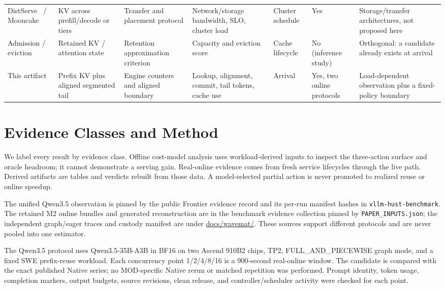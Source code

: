 \documentclass[conference]{IEEEtran}
\begin{document}
\begin{table}[t]
\begin{tabular}{p{}p{}p{}p{}p{}p{}p{}}
DistServe~\cite{distserve2024} / Mooncake~\cite{mooncake2025} & KV across prefill/decode or tiers & Transfer and placement protocol & Network/storage bandwidth, SLO, cluster load & Cluster schedule & Yes & Storage/transfer architectures, not proposed here \\
Admission / eviction~\cite{h2o2023} & Retained KV / attention state & Retention approximation criterion & Capacity and eviction score & Cache lifecycle & No (inference study) & Orthogonal: a candidate already exists at arrival \\
This artifact & Prefix KV plus aligned segmented tail & Engine counters and aligned boundary & Lookup, alignment, commit, tail tokens, cache use & Arrival & Yes, two online protocols & Load-dependent observation plus a fixed-policy boundary \\
\bottomrule
\end{tabular}
\end{table}

\section{Evidence Classes and Method}
We label every result by evidence class. Offline cost-model analysis uses
workload-derived inputs to inspect the three-action surface and oracle headroom;
it cannot demonstrate a serving gain. Real-online evidence comes from fresh
service lifecycles through the live path. Derived artifacts are tables and
verdicts rebuilt from those data. A model-selected partial action is never
promoted to realized reuse or online speedup.

The unified Qwen3.5 observation is pinned by the public Frontier evidence record
and its per-run manifest hashes in \texttt{vllm-hust-benchmark}. The retained M2
online bundles and generated reconstruction are in the benchmark evidence
collection pinned by \texttt{PAPER\_INPUTS.json}; the independent graph/eager
traces and custody manifest are under \url{docs/wavemat/}. These sources support
different protocols and are never pooled into one estimator.

The Qwen3.5 protocol uses Qwen3.5-35B-A3B in BF16 on two Ascend 910B2 chips,
TP2, FULL\_AND\_PIECEWISE graph mode, and a fixed SWE prefix-reuse workload.
Each concurrency point 1/2/4/8/16 is a 900-second real-online window. The
candidate is compared with the exact published Native series; no MOD-specific
Native rerun or matched repetition was performed. Prompt identity, token usage,
completion markers, output budgets, source revisions, clean release, and
controller/scheduler activity were checked for each point.
\end{document}
